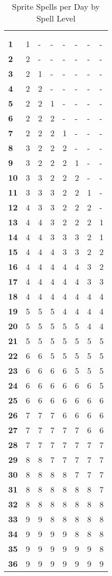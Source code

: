 \begin{multicols*}{2}
\begin {table}[H]
  \caption{Sprite Spells per Day by Spell Level}
  \begin{tabularx}{\columnwidth}{>{\bfseries}YYYYYYYY}
	\thead{} & \\
	 &  &  &  &  &  &  & \\
	1 & 1 & - & - & - & - & - & -\\
	2 & 2 & - & - & - & - & - & -\\
	3 & 2 & 1 & - & - & - & - & -\\
	4 & 2 & 2 & - & - & - & - & -\\
	5 & 2 & 2 & 1 & - & - & - & -\\
	6 & 2 & 2 & 2 & - & - & - & -\\
	7 & 2 & 2 & 2 & 1 & - & - & -\\
	8 & 3 & 2 & 2 & 2 & - & - & -\\
	9 & 3 & 2 & 2 & 2 & 1 & - & -\\
	10 & 3 & 3 & 2 & 2 & 2 & - & -\\
	11 & 3 & 3 & 3 & 2 & 2 & 1 & -\\
	12 & 4 & 3 & 3 & 2 & 2 & 2 & -\\
	13 & 4 & 4 & 3 & 2 & 2 & 2 & 1\\
	14 & 4 & 4 & 3 & 3 & 3 & 2 & 1\\
	15 & 4 & 4 & 4 & 3 & 3 & 2 & 2\\
	16 & 4 & 4 & 4 & 4 & 4 & 3 & 2\\
	17 & 4 & 4 & 4 & 4 & 4 & 3 & 3\\
	18 & 4 & 4 & 4 & 4 & 4 & 4 & 4\\
	19 & 5 & 5 & 5 & 4 & 4 & 4 & 4\\
	20 & 5 & 5 & 5 & 5 & 5 & 4 & 4\\
	21 & 5 & 5 & 5 & 5 & 5 & 5 & 5\\
	22 & 6 & 6 & 5 & 5 & 5 & 5 & 5\\
	23 & 6 & 6 & 6 & 6 & 5 & 5 & 5\\
	24 & 6 & 6 & 6 & 6 & 6 & 6 & 5\\
	25 & 6 & 6 & 6 & 6 & 6 & 6 & 6\\
	26 & 7 & 7 & 7 & 6 & 6 & 6 & 6\\
	27 & 7 & 7 & 7 & 7 & 7 & 6 & 6\\
	28 & 7 & 7 & 7 & 7 & 7 & 7 & 7\\
	29 & 8 & 8 & 7 & 7 & 7 & 7 & 7\\
	30 & 8 & 8 & 8 & 8 & 7 & 7 & 7\\
	31 & 8 & 8 & 8 & 8 & 8 & 8 & 7\\
	32 & 8 & 8 & 8 & 8 & 8 & 8 & 8\\
	33 & 9 & 9 & 8 & 8 & 8 & 8 & 8\\
	34 & 9 & 9 & 9 & 9 & 8 & 8 & 8\\
	35 & 9 & 9 & 9 & 9 & 9 & 9 & 8\\
	36 & 9 & 9 & 9 & 9 & 9 & 9 & 9
  \end {tabularx}
\end {table}


\end{multicols*}
